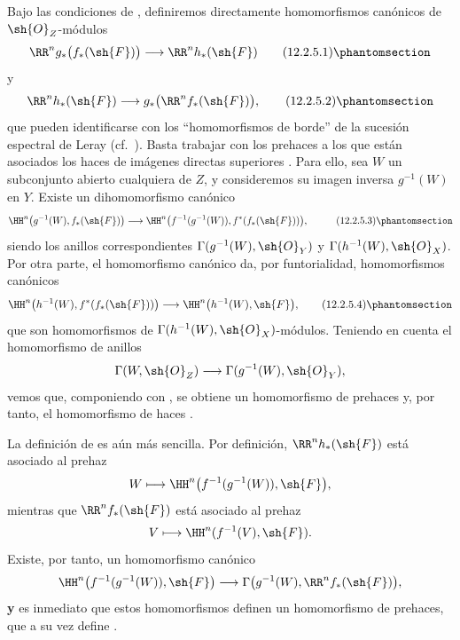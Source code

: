 \documentclass[oneside]{amsart}
\newcommand{\oldpage}[2][]{{\marginnote{\normalfont\textbf{#1}~|~#2}}\ignorespaces}
\let\EGAOriginalLabel\label
\renewcommand{\label}[1]{\phantomsection\EGAOriginalLabel{#1}}
\begin{document}
\begin{env}[12.2.5]
\label{0.12.2.5}
Bajo las condiciones de , definiremos directamente
homomorfismos canónicos de $\sh{O}_Z$-módulos
\[
  \RR^n g_*\bigl(f_*(\sh{F})\bigr)
  \longrightarrow\RR^n h_*(\sh{F})
  \tag{12.2.5.1}
  \label{0.12.2.5.1}
\]
y
\[
  \RR^n h_*(\sh{F})
  \longrightarrow g_*\bigl(\RR^n f_*(\sh{F})\bigr),
  \tag{12.2.5.2}
  \label{0.12.2.5.2}
\]
\oldpage[0\textsubscript{III}]{59}
que pueden identificarse con los ``homomorfismos de borde'' de la sucesión
espectral de Leray (cf.\ ).
Basta trabajar con los prehaces a los que están asociados los haces de
imágenes directas superiores .
Para ello, sea $W$ un subconjunto abierto cualquiera de $Z$, y consideremos
su imagen inversa $g^{-1}(W)$ en $Y$.  Existe un
dihomomorfismo canónico
\[
  \begin{aligned}
  \HH^n\bigl(g^{-1}(W),f_*(\sh{F})\bigr)
  &\longrightarrow
  \HH^n\bigl(f^{-1}(g^{-1}(W)),
    f^*(f_*(\sh{F}))\bigr),
  \end{aligned}
  \tag{12.2.5.3}
  \label{0.12.2.5.3}
\]
siendo los anillos correspondientes
$\Gamma(g^{-1}(W),\sh{O}_Y)$ y
$\Gamma(h^{-1}(W),\sh{O}_X)$.
Por otra parte, el homomorfismo canónico
 da, por funtorialidad,
homomorfismos canónicos
\[
  \HH^n\bigl(h^{-1}(W),f^*(f_*(\sh{F}))\bigr)
  \longrightarrow
  \HH^n\bigl(h^{-1}(W),\sh{F}\bigr),
  \tag{12.2.5.4}
  \label{0.12.2.5.4}
\]
que son homomorfismos de
$\Gamma(h^{-1}(W),\sh{O}_X)$-módulos.
Teniendo en cuenta el homomorfismo de anillos
\[
  \Gamma(W,\sh{O}_Z)
  \longrightarrow\Gamma(g^{-1}(W),\sh{O}_Y),
\]
vemos que, componiendo  con
, se obtiene un homomorfismo de prehaces y, por tanto, el
homomorfismo de haces .

La definición de  es aún más sencilla.
Por definición, $\RR^n h_*(\sh{F})$ está asociado al prehaz
\[
  W\longmapsto
  \HH^n\bigl(f^{-1}(g^{-1}(W)),\sh{F}\bigr),
\]
mientras que $\RR^n f_*(\sh{F})$ está asociado al prehaz
\[
  V\longmapsto\HH^n(f^{-1}(V),\sh{F}).
\]
Existe, por tanto, un homomorfismo canónico
\[
  \HH^n\bigl(f^{-1}(g^{-1}(W)),\sh{F}\bigr)
  \longrightarrow
  \Gamma\bigl(g^{-1}(W),\RR^n f_*(\sh{F})\bigr),
\]
\textbf{y} es inmediato que estos homomorfismos definen un homomorfismo de
prehaces, que a su vez define .
\end{env}
\end{document}
